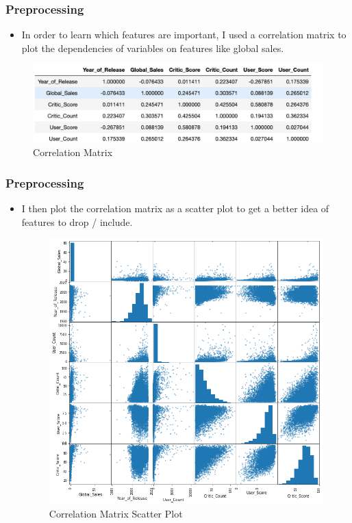 \begin{frame}
    \frametitle{Preprocessing}
    

    \begin{itemize}
    \item In order to learn which features are important, I used a correlation matrix to plot the dependencies of variables on features like global sales.
       
    
     \end{itemize}   
    \begin{figure}[H]
        \centering
        \includegraphics[scale=0.5]{graphs/correlationmat.png}
        \caption{Correlation Matrix}
        \label{fig:N20}
    \end{figure}
\end{frame}

\begin{frame}
    \frametitle{Preprocessing}
    \begin{itemize}
    \item I then plot the correlation matrix as a scatter plot to get a better idea of features to drop / include. 
    
     \begin{figure}[H]
        \centering
        \includegraphics[scale=0.25]{graphs/plotcorr.png}
        \caption{Correlation Matrix Scatter Plot}
        \label{fig:N20}
    \end{figure}
    
    \end{itemize}
\end{frame}

